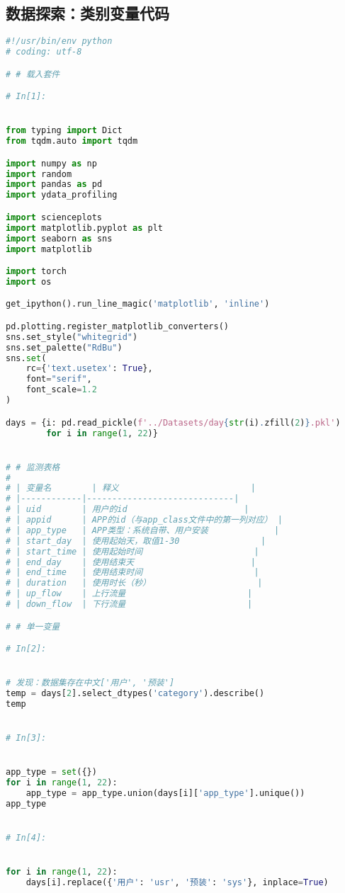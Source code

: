\documentclass[withoutpreface,bwprint]{cumcmthesis}
\begin{document}
\begin{appendices}
    \section{数据探索：类别变量代码}

    \begin{lstlisting}[language=Python]
#!/usr/bin/env python
# coding: utf-8

# # 载入套件

# In[1]:


from typing import Dict
from tqdm.auto import tqdm

import numpy as np
import random
import pandas as pd
import ydata_profiling

import scienceplots
import matplotlib.pyplot as plt
import seaborn as sns
import matplotlib

import torch
import os

get_ipython().run_line_magic('matplotlib', 'inline')

pd.plotting.register_matplotlib_converters()
sns.set_style("whitegrid")
sns.set_palette("RdBu")
sns.set(
    rc={'text.usetex': True},
    font="serif",
    font_scale=1.2
)

days = {i: pd.read_pickle(f'../Datasets/day{str(i).zfill(2)}.pkl')
        for i in range(1, 22)}


# # 监测表格
# 
# | 变量名        | 释义                          |
# |------------|-----------------------------|
# | uid        | 用户的id                       |
# | appid      | APP的id（与app_class文件中的第一列对应） |
# | app_type   | APP类型：系统自带、用户安装             |
# | start_day  | 使用起始天，取值1-30                |
# | start_time | 使用起始时间                      |
# | end_day    | 使用结束天                       |
# | end_time   | 使用结束时间                      |
# | duration   | 使用时长（秒）                     |
# | up_flow    | 上行流量                        |
# | down_flow  | 下行流量                        |

# # 单一变量

# In[2]:


# 发现：数据集存在中文['用户', '预装']
temp = days[2].select_dtypes('category').describe()
temp


# In[3]:


app_type = set({})
for i in range(1, 22):
    app_type = app_type.union(days[i]['app_type'].unique())
app_type


# In[4]:


for i in range(1, 22):
    days[i].replace({'用户': 'usr', '预装': 'sys'}, inplace=True)



\end{lstlisting}
\end{appendices}
\end{document}

